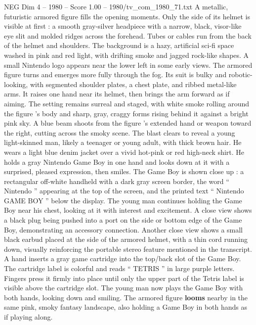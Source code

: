 \begin{textsample}{NEG Dim 4 – 1980 – Score 1.00 – 1980/tv\_com\_1980\_71.txt}  \label{ex:f4_neg_056}
A metallic, futuristic armored figure fills the opening moments.
Only the side of its helmet is visible at first : a smooth gray-silver headpiece with a narrow, black, visor-like eye slit and molded ridges across the forehead.
Tubes or cables run from the back of the helmet and shoulders.
The background is a hazy, artificial sci-fi space washed in pink and red light, with drifting smoke and jagged rock-like shapes.
A small Nintendo logo appears near the lower left in some early views.
The armored figure turns and emerges more fully through the fog.
Its suit is bulky and robotic-looking, with segmented shoulder plates, a chest plate, and ribbed metal-like arms.
It raises one hand near its helmet, then brings the arm forward as if aiming.
The setting remains surreal and staged, with white smoke rolling around the figure ’s body and sharp, gray, craggy forms rising behind it against a bright pink sky.
A blue beam shoots from the figure ’s extended hand or weapon toward the right, cutting across the smoky scene.
The blast clears to reveal a young light-skinned man, likely a teenager or young adult, with thick brown hair.
He wears a light blue denim jacket over a vivid hot-pink or red high-neck shirt.
He holds a gray Nintendo Game Boy in one hand and looks down at it with a surprised, pleased expression, then smiles.
The Game Boy is shown close up : a rectangular off-white handheld with a dark gray screen border, the word “ Nintendo ” appearing at the top of the screen, and the printed text “ Nintendo GAME BOY ” below the display.
The young man continues holding the Game Boy near his chest, looking at it with interest and excitement.
A close view shows a black plug being pushed into a port on the side or bottom edge of the Game Boy, demonstrating an accessory connection.
Another close view shows a small black earbud placed at the side of the armored helmet, with a thin cord running down, visually reinforcing the portable stereo feature mentioned in the transcript.
A hand inserts a gray game cartridge into the top/back slot of the Game Boy.
The cartridge label is colorful and reads “ TETRIS ” in large purple letters.
Fingers press it firmly into place until only the upper part of the Tetris label is visible above the cartridge slot.
The young man now plays the Game Boy with both hands, looking down and smiling.
The armored figure \textbf{looms} nearby in the same pink, smoky fantasy landscape, also holding a Game Boy in both hands as if playing along.

\end{textsample}
